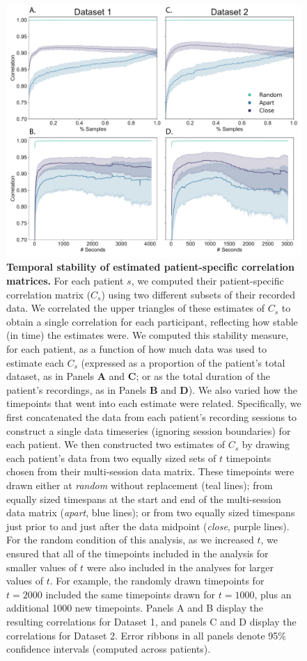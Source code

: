 \documentclass[11pt]{article}
\begin{document}
\begin{figure}[p]
\centering \includegraphics[width=\textwidth]{figs/supplemental_7}
\caption{\textbf{Temporal stability of estimated patient-specific
    correlation matrices.}  For each patient $s$, we computed their
  patient-specific correlation matrix ($C_s$) using two different
  subsets of their recorded data.  We correlated the upper triangles
  of these estimates of $C_s$ to obtain a single correlation for each
  participant, reflecting how stable (in time) the estimates were.  We
  computed this stability measure, for each patient, as a function of
  how much data was used to estimate each $C_s$ (expressed as a
  proportion of the patient's total dataset, as in Panels \textbf{A}
  and \textbf{C}; or as the total duration of the patient's
  recordings, as in Panels \textbf{B} and \textbf{D}).  We also varied
  how the timepoints that went into each estimate were
  related. Specifically, we first concatenated the data from each
  patient's recording sessions to construct a single data timeseries
  (ignoring session boundaries) for each patient.  We then constructed
  two estimates of $C_s$ by drawing each patient's data from two
  equally sized sets of $t$ timepoints chosen from their multi-session
  data matrix.  These timepoints were drawn either at \textit{random}
  without replacement (teal lines); from equally sized timespans at
  the start and end of the multi-session data matrix (\textit{apart},
  blue lines); or from two equally sized timespans just prior to and
  just after the data midpoint (\textit{close}, purple lines).  For
  the random condition of this analysis, as we increased $t$, we
  ensured that all of the timepoints included in the analysis for
  smaller values of $t$ were also included in the analyses for larger
  values of $t$.  For example, the randomly drawn timepoints for
  $t = 2000$ included the same timepoints drawn for $t = 1000$, plus
  an additional 1000 new timepoints.  Panels A and B display the
  resulting correlations for Dataset 1, and panels C and D display the
  correlations for Dataset 2.  Error ribbons in all panels denote 95\%
  confidence intervals (computed across patients).}
\label{fig:supplemental_7}
\end{figure}
\end{document}
